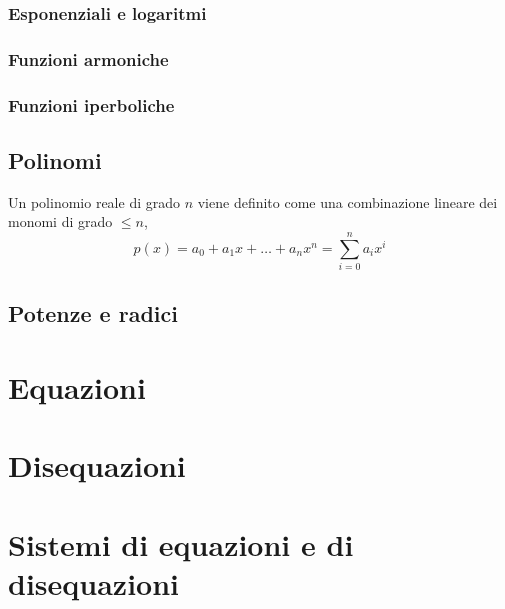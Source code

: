 \begin{definition}
\end{definition}

\subsection{Esponenziali e logaritmi}
\subsection{Funzioni armoniche}
\subsection{Funzioni iperboliche}

\section{Polinomi}
\begin{definition}[Polinomio]
Un polinomio reale di grado $n$ viene definito come una combinazione lineare dei monomi di grado $\le n$,
\begin{equation}
 p(x) = a_0 + a_1 x + \dots + a_n x^n = \sum_{i=0}^{n} a_i x^i
\end{equation}
\end{definition}

\section{Potenze e radici}
\begin{definition}
\end{definition}


\chapter{Equazioni}

\chapter{Disequazioni}

\chapter{Sistemi di equazioni e di disequazioni}
